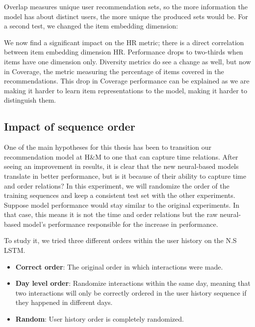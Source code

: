 \documentclass{kththesis}
\begin{document}
Overlap measures unique user recommendation sets, so the more information the model has about distinct users, the more unique the produced sets would be. For a second test, we changed the item embedding dimension:

\begin{center}

\end{center}

We now find a significant impact on the HR metric; there is a direct correlation between item embedding dimension HR. Performance drops to two-thirds when items have one dimension only. Diversity metrics do see a change as well, but now in Coverage, the metric measuring the percentage of items covered in the recommendations. This drop in Coverage performance can be explained as we are making it harder to learn item representations to the model, making it harder to distinguish them. 


\subsection{Impact of sequence order}
One of the main hypotheses for this thesis has been to transition our recommendation model at H\&M to one that can capture time relations. After seeing an improvement in results, it is clear that the new neural-based models translate in better performance, but is it because of their ability to capture time and order relations? In this experiment, we will randomize the order of the training sequences and keep a consistent test set with the other experiments. Suppose model performance would stay similar to the original experiments. In that case, this means it is not the time and order relations but the raw neural-based model's performance responsible for the increase in performance. 

To study it, we tried three different orders within the user history on the N.S LSTM. 

\begin{itemize}
    \item \textbf{Correct order}: The original order in which interactions were made.
    \item \textbf{Day level order}: Randomize interactions within the same day, meaning that two interactions will only be correctly ordered in the user history sequence if they happened in different days.
    \item \textbf{Random}: User history order is completely randomized.
\end{itemize}
\end{document}
